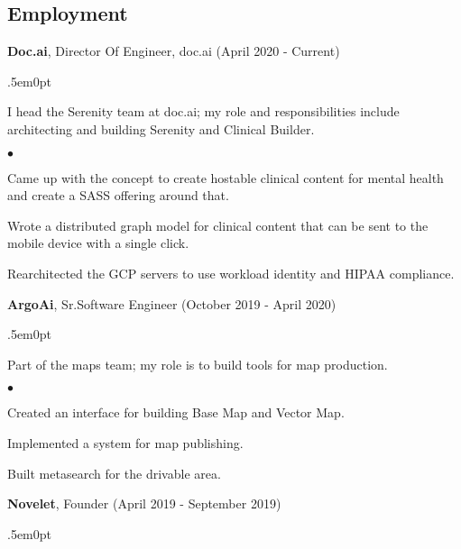 \documentclass[margin, line, 10pt]{res}
\newenvironment{list2}{
  \begin{list}{$\bullet$}{%
      \setlength{\itemsep}{0in}
      \setlength{\parsep}{0in} \setlength{\parskip}{0in}
      \setlength{\topsep}{0in} \setlength{\partopsep}{0in}
      \setlength{\leftmargin}{0.2in}}}{\end{list}}
\begin{document}
\begin{resume}
\section{Employment}


\vspace{.05cm}

{\Large {\bf Doc.ai}}, Director Of Engineer, doc.ai  \hfill (April 2020 - Current)\\
\begin{adjustwidth}{.5em}{0pt}

  \vspace{-.3cm}
  I head the Serenity team at doc.ai; my role and responsibilities include architecting and building Serenity and Clinical Builder. \\

  \begin{list2}
    \item Came up with the concept to create hostable clinical content for mental health and create a SASS offering around that.
    \item Wrote a distributed graph model for clinical content that can be sent to the mobile device with a single click.
    \item Rearchitected the GCP servers to use workload identity and HIPAA compliance.
  \end{list2}

\end{adjustwidth}


{\Large {\bf ArgoAi}}, Sr.Software Engineer  \hfill (October 2019 - April 2020)\\
\begin{adjustwidth}{.5em}{0pt}

  \vspace{-.3cm}
  Part of the maps team; my role is to build tools for map production.\\

  \begin{list2}
    \item Created an interface for building Base Map and Vector Map.
    \item Implemented a system for map publishing.
    \item Built metasearch for the drivable area.
  \end{list2}

\end{adjustwidth}

{\Large {\bf Novelet}}, Founder  \hfill (April 2019 - September 2019)\\
\begin{adjustwidth}{.5em}{0pt}


\end{adjustwidth}
\end{resume}
\end{document}

